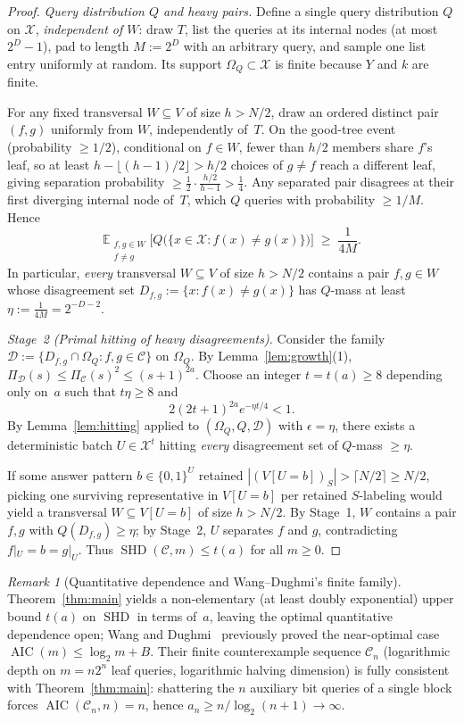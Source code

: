\documentclass[11pt]{article}
\theoremstyle{plain}
\theoremstyle{definition}
\theoremstyle{remark}
\newtheorem{remark}{Remark}
\DeclareMathOperator{\AIC}{AIC}
\DeclareMathOperator{\SHD}{SHD}
\begin{document}
\begin{proof}
\emph{Query distribution $Q$ and heavy pairs.} Define a single query distribution $Q$ on $\mathcal{X}$, \emph{independent of $W$}: draw $T$, list the queries at its internal nodes (at most $2^D - 1$), pad to length $M := 2^D$ with an arbitrary query, and sample one list entry uniformly at random. Its support $\Omega_Q \subset \mathcal{X}$ is finite because $Y$ and $k$ are finite.

For any fixed transversal $W \subseteq V$ of size $h > N/2$, draw an ordered distinct pair $(f,g)$ uniformly from $W$, independently of~$T$. On the good-tree event (probability $\ge 1/2$), conditional on $f \in W$, fewer than $h/2$ members share $f$'s leaf, so at least $h - \lfloor(h-1)/2\rfloor > h/2$ choices of $g \neq f$ reach a different leaf, giving separation probability $\ge \frac{1}{2} \cdot \frac{h/2}{h-1} > \frac{1}{4}$. Any separated pair disagrees at their first diverging internal node of~$T$, which $Q$ queries with probability $\ge 1/M$. Hence
\[
\mathbb{E}_{\substack{f, g \in W \\ f \neq g}}\bigl[Q\bigl(\{x \in \mathcal{X} : f(x) \neq g(x)\}\bigr)\bigr] \;\ge\; \frac{1}{4M}.
\]
In particular, \emph{every} transversal $W \subseteq V$ of size $h > N/2$ contains a pair $f, g \in W$ whose disagreement set $D_{f,g} := \{x : f(x) \neq g(x)\}$ has $Q$-mass at least $\eta := \frac{1}{4M} = 2^{-D-2}$.

\emph{Stage~2 (Primal hitting of heavy disagreements).} Consider the family $\mathcal{D} := \{D_{f,g} \cap \Omega_Q : f, g \in \mathcal{C}\}$ on $\Omega_Q$. By Lemma~\ref{lem:growth}(1), $\Pi_{\mathcal{D}}(s) \le \Pi_{\mathcal{C}}(s)^2 \le (s+1)^{2a}$. Choose an integer $t = t(a) \ge 8$ depending only on~$a$ such that $t\eta \ge 8$ and
\[
2(2t+1)^{2a} e^{-\eta t/4} < 1.
\]
By Lemma~\ref{lem:hitting} applied to $(\Omega_Q, Q, \mathcal{D})$ with $\epsilon = \eta$, there exists a deterministic batch $U \in \mathcal{X}^t$ hitting \emph{every} disagreement set of $Q$-mass $\ge \eta$.

If some answer pattern $b \in \{0,1\}^U$ retained $|(V[U = b])_S| > \lceil N/2 \rceil \ge N/2$, picking one surviving representative in $V[U=b]$ per retained $S$-labeling would yield a transversal $W \subseteq V[U=b]$ of size $h > N/2$. By Stage~1, $W$ contains a pair $f, g$ with $Q(D_{f,g}) \ge \eta$; by Stage~2, $U$ separates $f$ and $g$, contradicting $f|_U = b = g|_U$. Thus $\SHD(\mathcal{C}, m) \le t(a)$ for all $m \ge 0$.
\end{proof}

\begin{remark}[Quantitative dependence and Wang--Dughmi's finite family]
Theorem~\ref{thm:main} yields a non-elementary (at least doubly exponential) upper bound $t(a)$ on $\SHD$ in terms of~$a$, leaving the optimal quantitative dependence open; Wang and Dughmi~\cite{WangDughmi2026} previously proved the near-optimal case $\AIC(m) \le \log_2 m + B$. Their finite counterexample sequence $\mathcal{C}_n$ (logarithmic depth on $m = n2^n$ leaf queries, logarithmic halving dimension) is fully consistent with Theorem~\ref{thm:main}: shattering the $n$ auxiliary bit queries of a single block forces $\AIC(\mathcal{C}_n, n) = n$, hence $a_n \ge n / \log_2(n+1) \to \infty$.
\end{remark}
\end{document}
